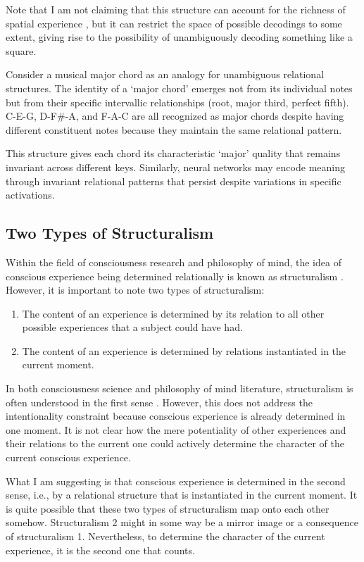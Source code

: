 \documentclass[11pt]{article}
\begin{document}
Note that I am not claiming that this structure can account for the richness of spatial experience \cite{haun2019}, but it can restrict the space of possible decodings to some extent, giving rise to the possibility of unambiguously decoding something like a square.

Consider a musical major chord as an analogy for unambiguous relational structures. The identity of a `major chord' emerges not from its individual notes but from their specific intervallic relationships (root, major third, perfect fifth). C-E-G, D-F\#-A, and F-A-C are all recognized as major chords despite having different constituent notes because they maintain the same relational pattern.

This structure gives each chord its characteristic `major' quality that remains invariant across different keys. Similarly, neural networks may encode meaning through invariant relational patterns that persist despite variations in specific activations.

\subsection{Two Types of Structuralism}

Within the field of consciousness research and philosophy of mind, the idea of conscious experience being determined relationally is known as structuralism \cite{lyre2022}. However, it is important to note two types of structuralism:

\begin{enumerate}
\item The content of an experience is determined by its relation to all other possible experiences that a subject could have had.
\item The content of an experience is determined by relations instantiated in the current moment.
\end{enumerate}

In both consciousness science and philosophy of mind literature, structuralism is often understood in the first sense \cite{lyre2022}. However, this does not address the intentionality constraint because conscious experience is already determined in one moment. It is not clear how the mere potentiality of other experiences and their relations to the current one could actively determine the character of the current conscious experience.

What I am suggesting is that conscious experience is determined in the second sense, i.e., by a relational structure that is instantiated in the current moment. It is quite possible that these two types of structuralism map onto each other somehow. Structuralism 2 might in some way be a mirror image or a consequence of structuralism 1. Nevertheless, to determine the character of the current experience, it is the second one that counts.
\end{document}
